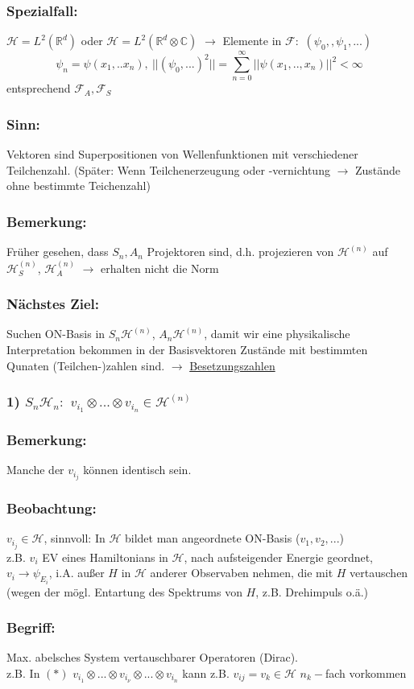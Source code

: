 \documentclass[twoside,a4paper]{scrartcl}
\newcommand{\R}{\mathbb{R}}
\newcommand{\C}{\mathbb{C}}
\renewcommand{\1}{\mathds{1}}
\newcommand{\ra}{\rightarrow}
\renewcommand{\H}{\mathcal{H}}
\newcommand{\F}{\mathcal{F}}
\renewcommand{\R}{\mathbb{R}}
\renewcommand{\C}{\mathbb{C}}
\begin{document}
\subsubsection*{Spezialfall:} 
$\H=L^2(\R^d)$ oder $\H=L^2(\R^d \otimes \C)$ $\ra$ Elemente in $\F:$ $(\psi_0,,\psi_1,...)$
$$\psi_n=\psi(x_1,..x_n), \ ||(\psi_0,...)^2||=\sum_{n=0}^\infty ||\psi(x_1,..,x_n)||^2 < \infty$$
entsprechend $\F_A, \F_S$
\subsubsection*{Sinn:} 
Vektoren sind Superpositionen von Wellenfunktionen mit verschiedener Teilchenzahl. (Später: Wenn Teilchenerzeugung oder -vernichtung $\ra$ Zustände ohne bestimmte Teichenzahl)
\subsubsection*{Bemerkung:} 
Früher gesehen, dass $S_n,A_n$ Projektoren sind, d.h. projezieren von $\H^{(n)}$ auf $\H^{(n)}_S$, $\H^{(n)}_A$ $\ra$ erhalten nicht die Norm
\subsubsection*{Nächstes Ziel:} 
Suchen ON-Basis in $S_n\H^{(n)}$, $A_n \H^{(n)}$, damit wir eine physikalische Interpretation bekommen in der Basisvektoren Zustände mit bestimmten Qunaten (Teilchen-)zahlen sind. $\ra$ \underline{Besetzungszahlen}
\subsubsection*{1) $S_n\H_n:$ $v_{i_1}\otimes ... \otimes v_{i_n}\in \H^{(n)}$} 
\subsubsection*{Bemerkung:} 
Manche der $v_{i_j}$ können identisch sein.
\subsubsection*{Beobachtung:} 
 $v_{i_j}\in \H$, sinnvoll: In $\H$ bildet man angeordnete ON-Basis ($v_1,v_2,...$)\\
z.B. $v_i$ EV eines Hamiltonians in $\H$, nach aufsteigender Energie geordnet, $v_i\ra \psi_{E_i}$, i.A. außer $H$ in $\H$ anderer Observaben nehmen, die mit $H$ vertauschen (wegen der mögl. Entartung des Spektrums von $H$, z.B. Drehimpuls o.ä.)
\subsubsection*{Begriff:} 
Max. abelsches System vertauschbarer Operatoren (Dirac).\\
z.B. In $(*)$ $v_{i_1}\otimes ... \otimes v_{i_\nu}\otimes ... \otimes v_{i_n}$ kann z.B. $v_{ij}=v_k \in \H$ $n_k-$fach vorkommen
\end{document}
